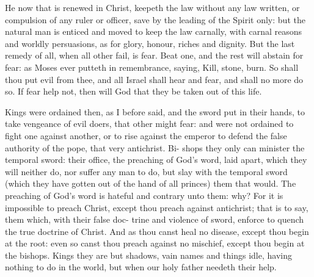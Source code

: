 \documentclass{custom}
\begin{document}
He now that is renewed in Christ, keepeth the law 
without any law written, or compulsion of any ruler or 
officer, save by the leading of the Spirit only: but the 
natural man is enticed and moved to keep the law carnally,
with carnal reasons and worldly persuasions, as for glory,
honour, riches and dignity. But the last remedy of all, 
when all other fail, is fear. Beat one, and the rest will 
abstain for fear: as Moses ever putteth in remembrance, 
saying, Kill, stone, burn. So shall thou put evil from 
thee, and all Israel shall hear and fear, and shall no more 
do so. If fear help not, then will God that they be taken 
out of this life. 

Kings were ordained then, as I before said, and the 
sword put in their hands, to take vengeance of evil doers,
that other might fear: and were not ordained to fight one 
against another, or to rise against the emperor to defend 
the false authority of the pope, that very antichrist. Bi- 
shops they only can minister the temporal sword: their 
office, the preaching of God's word, laid apart, which they 
will neither do, nor suffer any man to do, but slay with the 
temporal sword (which they have gotten out of the hand 
of all princes) them that would. The preaching of God's 
word is hateful and contrary unto them: why? For it is 
impossible to preach Christ, except thou preach against 
antichrist; that is to say, them which, with their false doc- 
trine and violence of sword, enforce to quench the true 
doctrine of Christ. And as thou canst heal no disease,
except thou begin at the root: even so canst thou preach 
against no mischief, except thou begin at the bishops. 
Kings they are but shadows, vain names and things idle, 
having nothing to do in the world, but when our holy
father needeth their help. 
\end{document}
